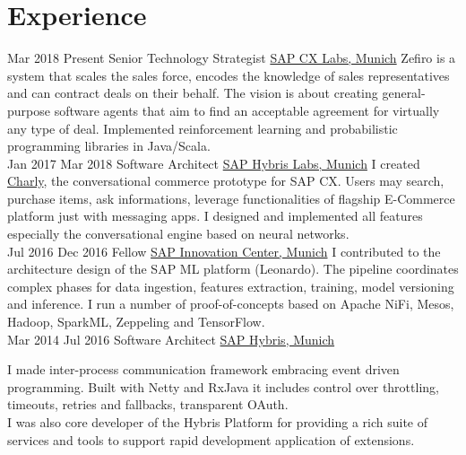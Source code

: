 \documentclass[letterpaper, 7pt]{twentysecondcv} %
\begin{document}
\makeprofile %


\section{Experience}

\begin{twenty} %
\twentyitem
    	{Mar 2018}
		{Present}
        {Senior Technology Strategist}
        {\href{http://cx.sap.com/}{SAP CX Labs, Munich}}
        {}
        {
    		Zefiro is a system that scales the sales force, encodes the knowledge of sales representatives and can contract deals on their behalf. The vision is about creating general-purpose software agents that aim to find an acceptable agreement for virtually any type of deal. Implemented reinforcement learning and probabilistic programming libraries in Java/Scala. 
	    }
        \\
\twentyitem
    	{Jan 2017}
		{Mar 2018}
        {Software Architect}
        {\href{http://cx.sap.com/}{SAP Hybris Labs, Munich}}
        {}
        {
        I created \href{http://charly.hybris.com/}{Charly}, the conversational commerce prototype for SAP CX. Users may search, purchase items, ask informations, leverage functionalities of flagship E-Commerce platform just with messaging apps.
      I designed and implemented all features especially the conversational engine based on neural networks.
      }
        \\
	\twentyitem
    	{Jul 2016}
		{Dec 2016}
        {Fellow}
        {\href{https://icn.sap.com/}{SAP Innovation Center, Munich}}
        {}
        {
        {
        I contributed to the architecture design of the SAP ML platform (Leonardo). The pipeline coordinates complex phases for data ingestion, features extraction, training,
      model versioning and inference. I run a number of proof-of-concepts based on Apache NiFi, Mesos, Hadoop, SparkML, Zeppeling and TensorFlow.
        }
        }
    \\
    \twentyitem
   		{Mar 2014}
		{Jul 2016}
        {Software Architect}
        {\href{http://www.hybris.com}{SAP Hybris, Munich}}
        {}
        {
        {
        I made inter-process communication framework embracing event driven programming. Built with Netty and RxJava it includes control over throttling, timeouts, retries and fallbacks, transparent OAuth.
        \\
        I was also core developer of the Hybris Platform for providing a rich suite of services and tools to support rapid development application of extensions. 

}}
\end{twenty}
\end{document}
